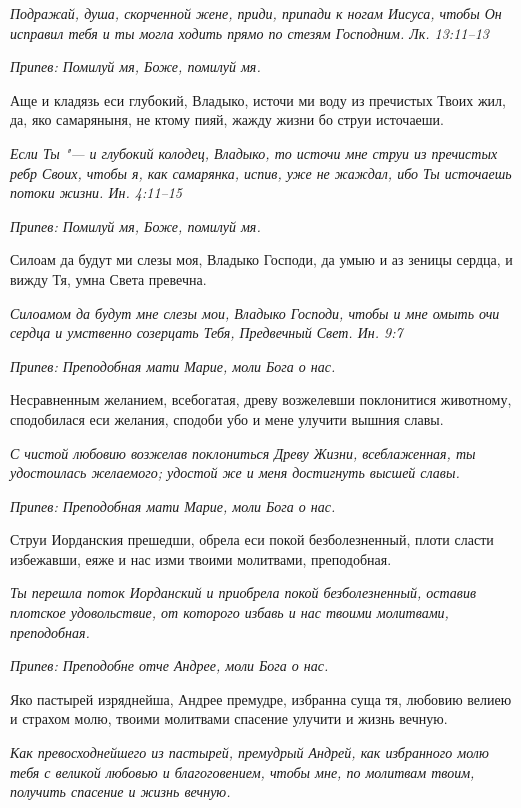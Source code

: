 \itshape Подражай, душа, скорченной жене, приди, припади к ногам Иисуса, чтобы Он исправил тебя и ты могла ходить прямо по стезям Господним. Лк. 13:11–13\normalfont{}


\itshape Припев:\normalfont{} Помилуй мя, Боже, помилуй мя.


Аще и кладязь еси глубокий, Владыко, источи ми воду из пречистых Твоих жил, да, яко самаряныня, не ктому пияй, жажду жизни бо струи источаеши.


\itshape Если Ты "--- и глубокий колодец, Владыко, то источи мне струи из пречистых ребр Своих, чтобы я, как самарянка, испив, уже не жаждал, ибо Ты источаешь потоки жизни. Ин. 4:11–15\normalfont{}


\itshape Припев:\normalfont{} Помилуй мя, Боже, помилуй мя.


Силоам да будут ми слезы моя, Владыко Господи, да умыю и аз зеницы сердца, и вижду Тя, умна Света превечна.


\itshape Силоамом да будут мне слезы мои, Владыко Господи, чтобы и мне омыть очи сердца и умственно созерцать Тебя, Предвечный Свет. Ин. 9:7\normalfont{}


\itshape Припев:\normalfont{} Преподобная мати Марие, моли Бога о нас.


Несравненным желанием, всебогатая, древу возжелевши поклонитися животному, сподобилася еси желания, сподоби убо и мене улучити вышния славы.


\itshape С чистой любовию возжелав поклониться Древу Жизни, всеблаженная, ты удостоилась желаемого; удостой же и меня достигнуть высшей славы.\normalfont{}


\itshape Припев:\normalfont{} Преподобная мати Марие, моли Бога о нас.


Струи Иорданския прешедши, обрела еси покой безболезненный, плоти сласти избежавши, еяже и нас изми твоими молитвами, преподобная.


\itshape Ты перешла поток Иорданский и приобрела покой безболезненный, оставив плотское удовольствие, от которого избавь и нас твоими молитвами, преподобная.\normalfont{}


\itshape Припев:\normalfont{} Преподобне отче Андрее, моли Бога о нас.


Яко пастырей изряднейша, Андрее премудре, избранна суща тя, любовию велиею и страхом молю, твоими молитвами спасение улучити и жизнь вечную.


\itshape Как превосходнейшего из пастырей, премудрый Андрей, как избранного молю тебя с великой любовью и благоговением, чтобы мне, по молитвам твоим, получить спасение и жизнь вечную.\normalfont{}



